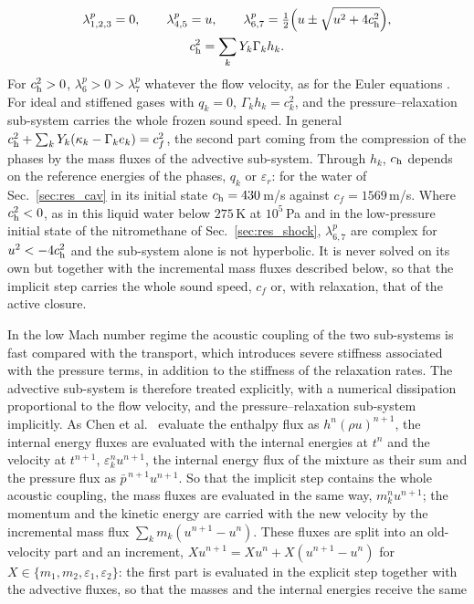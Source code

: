 \begin{enumerate}
\begin{equation}
\begin{gathered}
\lambda^p_{1,2,3}=0,\qquad\lambda^p_{4,5}=u,\qquad \lambda^p_{6,7}=\tfrac12\Big(u\pm\sqrt{u^2+4c_{\rm h}^2}\Big),\\
c_{\rm h}^2=\sum_kY_k\Gamma_kh_k .
\end{gathered}
\label{eq:eig_p}
\end{equation}
For $c_{\rm h}^2>0$, $\lambda^p_6>0>\lambda^p_7$ whatever the flow velocity, as for the Euler equations \cite{ToroVazquez2012}. For ideal and
stiffened gases with $q_k=0$, $\Gamma_kh_k=c_k^2$, and the pressure--relaxation sub-system carries the whole frozen sound speed. In
general $c_{\rm h}^2+\sum_kY_k(\kappa_k-\Gamma_ke_k)=c_f^2$, the second part coming from the compression of the phases by the mass fluxes
of the advective sub-system. Through $h_k$, $c_{\rm h}$ depends on the reference energies of the phases, $q_k$ or $\varepsilon_r$: for the water of
Sec.~\ref{sec:res_cav} in its initial state $c_{\rm h}=430$\,m/s against $c_f=1569$\,m/s. Where $c_{\rm h}^2<0$, as in this liquid water below $275$\,K
at $10^5$\,Pa and in the low-pressure initial state of the nitromethane of Sec.~\ref{sec:res_shock}, $\lambda^p_{6,7}$ are complex for $u^2<-4c_{\rm h}^2$
and the sub-system alone is not hyperbolic. It is never solved on its own but together with the incremental mass fluxes
described below, so that the implicit step carries the whole sound speed, $c_f$ or, with relaxation, that of the active
closure.
\end{enumerate}
In the low Mach number regime the acoustic coupling of the two sub-systems is fast compared with the transport, which
introduces severe stiffness associated with the pressure terms, in addition to the stiffness of the relaxation rates.
The advective sub-system is therefore treated explicitly, with a numerical dissipation proportional to the flow velocity,
and the pressure--relaxation sub-system implicitly. As Chen et al.\ \cite{Chen2026} evaluate the enthalpy flux as $h^n(\rho u)^{n+1}$,
the internal energy fluxes are evaluated with the internal energies at $t^n$ and the velocity at $t^{n+1}$, $\varepsilon^n_ku^{n+1}$, the internal
energy flux of the mixture as their sum and the pressure flux as $\bar p^{\,n+1}u^{n+1}$. So that the implicit step contains the whole
acoustic coupling, the mass fluxes are evaluated in the same way, $m^n_ku^{n+1}$; the momentum and the kinetic energy are carried
with the new velocity by the incremental mass flux $\sum_km_k(u^{n+1}-u^n)$. These fluxes are split into an old-velocity part and an
increment, $Xu^{n+1}=Xu^n+X(u^{n+1}-u^n)$ for $X\in\{m_1,m_2,\varepsilon_1,\varepsilon_2\}$: the first part is evaluated in the explicit step together with the advective fluxes, so that the masses and the internal energies receive the same
